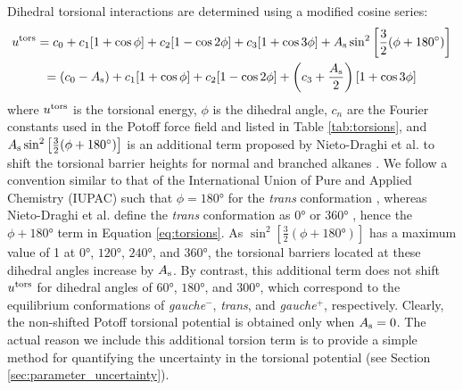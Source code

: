 \documentclass[preprint,review,12pt]{elsarticle}
\begin{document}
	Dihedral torsional interactions are determined using a modified cosine series:
	\begin{multline} \label{eq:torsions}
	u^{\rm tors} = c_0 + c_1 [1+\cos{\phi}] + c_2 [1-\cos{2\phi}] + c_3 [1+\cos{3\phi}] + A_{\rm s} \sin^2\left[\frac{3}{2}(\phi + \ang{180})\right] \\ = (c_0 - A_{\rm s}) + c_1 [1+\cos{\phi}] + c_2 [1-\cos{2\phi}] + \left(c_3 + \frac{A_{\rm s}}{2}\right) [1+\cos{3\phi}]
	\end{multline}
	where $u^{\rm tors}$ is the torsional energy, $\phi$ is the dihedral angle, $c_n$ are the Fourier constants used in the Potoff force field and listed in Table \ref{tab:torsions}, and $A_{\rm s} \sin^2\left[\frac{3}{2}(\phi + \ang{180})\right]$ is an additional term proposed by Nieto-Draghi et al. to shift the torsional barrier heights for normal and branched alkanes \cite{Nieto2006,Nieto2008}. We follow a convention similar to that of the International Union of Pure and Applied Chemistry (IUPAC) such that $\phi = \ang{180}$ for the \textit{trans} conformation \cite{Martin1999}, whereas Nieto-Draghi et al. define the \textit{trans} conformation as $\ang{0}$ or $\ang{360}$ \cite{Nieto2006,Nieto2008}, hence the $\phi+\ang{180}$ term in Equation \ref{eq:torsions}. As $\sin^2\left[\frac{3}{2}(\phi + \ang{180})\right]$ has a maximum value of 1 at $\ang{0}$, $\ang{120}$, $\ang{240}$, and $\ang{360}$, the torsional barriers located at these dihedral angles increase by $A_{\rm s}$. By contrast, this additional term does not shift $u^{\rm tors}$ for dihedral angles of $\ang{60}$, $\ang{180}$, and $\ang{300}$, which correspond to the equilibrium conformations of \textit{gauche}$^-$, \textit{trans}, and \textit{gauche}$^+$, respectively. Clearly, the non-shifted Potoff torsional potential is obtained only when $A_{\rm s} = 0$. The actual reason we include this additional torsion term is to provide a simple method for quantifying the uncertainty in the torsional potential (see Section \ref{sec:parameter_uncertainty}). 
	
\end{document}
